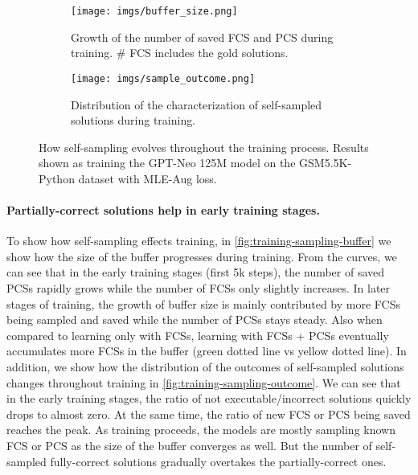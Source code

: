 \begin{figure}[ht]
    \centering
    \begin{subfigure}[b]{0.49\textwidth}
        \centering
        \texttt{[image: imgs/buffer\_size.png]}
        \caption{Growth of the number of saved FCS and PCS during training. \# FCS includes the gold solutions.}
        \label{fig:training-sampling-buffer}
    \end{subfigure}
    \hfill
    \begin{subfigure}[b]{0.49\textwidth}
        \centering
        \texttt{[image: imgs/sample\_outcome.png]}
        \caption{Distribution of the characterization of self-sampled solutions during training.}
        \label{fig:training-sampling-outcome}
    \end{subfigure}
    \caption{How self-sampling evolves throughout the training process. Results shown as training the GPT-Neo 125M model on the GSM5.5K-Python dataset with MLE-Aug loss.}
    \label{fig:training-sampling}
\end{figure} \paragraph{Partially-correct solutions help in early training stages.}
To show how self-sampling effects training, in \autoref{fig:training-sampling-buffer} we show how the size of the buffer progresses during training. From the curves, we can see that in the early training stages (\ie first 5k steps), the number of saved PCSs rapidly grows while the number of FCSs only slightly increases. In later stages of training, the growth of buffer size is mainly contributed by more FCSs being sampled and saved while the number of PCSs stays steady. Also when compared to learning only with FCSs, learning with FCSs + PCSs eventually accumulates more FCSs in the buffer (green dotted line vs yellow dotted line). 
In addition, we show how the distribution of the outcomes of self-sampled solutions changes throughout training in \autoref{fig:training-sampling-outcome}. We can see that in the early training stages, the ratio of not executable/incorrect solutions quickly drops to almost zero. At the same time, the ratio of new FCS or PCS being saved reaches the peak. As training proceeds, the models are mostly sampling known FCS or PCS as the size of the buffer converges as well. But the number of self-sampled fully-correct solutions gradually overtakes the partially-correct ones. 
